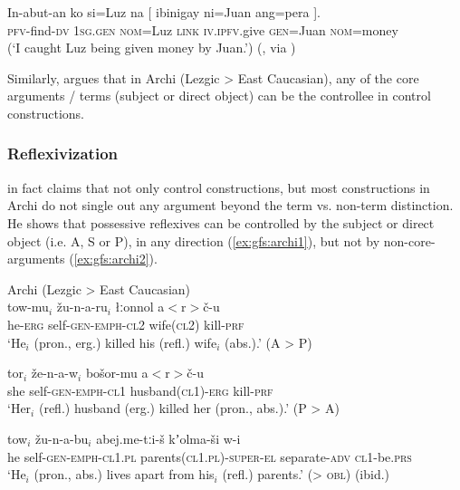 \documentclass[output=paper]{../langscibook}
\begin{document}
 \ex\label{ex:gfs:tag-obl}
 \gll *In-abut-an ko si=Luz na [ ibinigay ni=Juan ang=pera {\GAP}\textsubscript{}].\\
 \phantom{*}\textsc{pfv-}find-\textsc{dv} \textsc{1sg.gen} \textsc{nom=}Luz \textsc{link} \textsc{} \textsc{iv.ipfv.}give \textsc{gen=}Juan \textsc{nom=}money {}\\
 \trans (`I caught Luz being given money by Juan.') (\cite{Kroeger93}, via \cite[16]{DLM:LFG})\\
 \z

 Similarly, \citet{kibrik2000} argues that in Archi (Lezgic > East Caucasian), any of the core arguments / terms (subject or direct object) can be the controllee in control constructions.
 
 \subsubsection{Reflexivization\label{sect:gfs:term-refl}}
 
  \citet{kibrik2000} in fact claims that not only control constructions, but most constructions in Archi do not single out any argument beyond the term vs. non-term distinction. He shows that possessive reflexives can be controlled by the subject or direct object (i.e. A, S or P), in any direction (\ref{ex:gfs:archi1}), but not by non-core-arguments (\ref{ex:gfs:archi2}).
 
 \ea Archi (Lezgic > East Caucasian)\\
 \ea\label{ex:gfs:archi1}
 \gll tow-mu$_i$ žu-n-a-ru$_i$ łːonnol a$<${r}$>$č-u\\
 he-\textsc{erg} self-\textsc{gen-emph-cl2} wife(\textsc{cl2}) kill-\textsc{prf}\\
 \trans `He$_i$ (pron., erg.) killed his (refl.) wife$_i$ (abs.).' (A > P)
 
 \ex
 \gll tor$_i$ že-n-a-w$_i$ bošor-mu a$<${r}$>$č-u\\
 she self-\textsc{gen-emph-cl1} husband(\textsc{cl1})-\textsc{erg} kill-\textsc{prf}\\
 \trans `Her$_i$ (refl.) husband (erg.) killed her (pron., abs.).' (P > A) \\\hspace*{\fill}\citep[62]{kibrik2000}
 \z
 \z
 
 \ea\label{ex:gfs:archi2}
 \ea
 \gll tow$_i$ žu-n-a-bu$_i$ abej.me-tːi-š kʼolma-ši w-i\\
 he self-\textsc{gen-emph-cl1.pl} parents(\textsc{cl1.pl})-\textsc{super-el} separate-\textsc{adv} \textsc{cl1}-be.\textsc{prs}\\
 \trans `He$_i$ (pron., abs.) lives apart from his$_i$ (refl.) parents.' (\SUBJ > \textsc{obl}) (ibid.)
 
\end{document}

